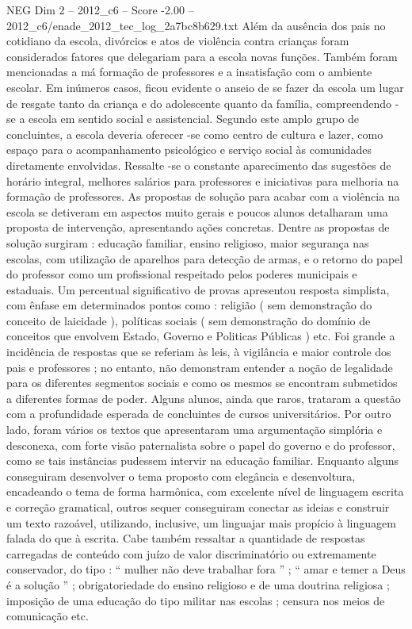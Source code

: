 \begin{textsample}{NEG Dim 2 – 2012\_c6 – Score -2.00 – 2012\_c6/enade\_2012\_tec\_log\_2a7bc8b629.txt}
Além da ausência dos pais no cotidiano da escola, divórcios e atos de violência contra crianças foram considerados fatores que delegariam para a escola novas funções.
Também foram mencionadas a má formação de professores e a insatisfação com o ambiente escolar.
Em inúmeros casos, ficou evidente o anseio de se fazer da escola um lugar de resgate tanto da criança e do adolescente quanto da família, compreendendo -se a escola em sentido social e assistencial.
Segundo este amplo grupo de concluintes, a escola deveria oferecer -se como centro de cultura e lazer, como espaço para o acompanhamento psicológico e serviço social às comunidades diretamente envolvidas.
Ressalte -se o constante aparecimento das sugestões de horário integral, melhores salários para professores e iniciativas para melhoria na formação de professores.
As propostas de solução para acabar com a violência na escola se detiveram em aspectos muito gerais e poucos alunos detalharam uma proposta de intervenção, apresentando ações concretas.
Dentre as propostas de solução surgiram : educação familiar, ensino religioso, maior segurança nas escolas, com utilização de aparelhos para detecção de armas, e o retorno do papel do professor como um profissional respeitado pelos poderes municipais e estaduais.
Um percentual significativo de provas apresentou resposta simplista, com ênfase em determinados pontos como : religião ( sem demonstração do conceito de laicidade ), políticas sociais ( sem demonstração do domínio de conceitos que envolvem Estado, Governo e Politicas Públicas ) etc.
Foi grande a incidência de respostas que se referiam às leis, à vigilância e maior controle dos pais e professores ; no entanto, não demonstram entender a noção de legalidade para os diferentes segmentos sociais e como os mesmos se encontram submetidos a diferentes formas de poder.
Alguns alunos, ainda que raros, trataram a questão com a profundidade esperada de concluintes de cursos universitários.
Por outro lado, foram vários os textos que apresentaram uma argumentação simplória e desconexa, com forte visão paternalista sobre o papel do governo e do professor, como se tais instâncias pudessem intervir na educação familiar.
Enquanto alguns conseguiram desenvolver o tema proposto com elegância e desenvoltura, encadeando o tema de forma harmônica, com excelente nível de linguagem escrita e correção gramatical, outros sequer conseguiram conectar as ideias e construir um texto razoável, utilizando, inclusive, um linguajar mais propício à linguagem falada do que à escrita.
Cabe também ressaltar a quantidade de respostas carregadas de conteúdo com juízo de valor discriminatório ou extremamente conservador, do tipo : “ mulher não deve trabalhar fora ” ; “ amar e temer a Deus é a solução ” ; obrigatoriedade do ensino religioso e de uma doutrina religiosa ; imposição de uma educação do tipo militar nas escolas ; censura nos meios de comunicação etc.

\end{textsample}
